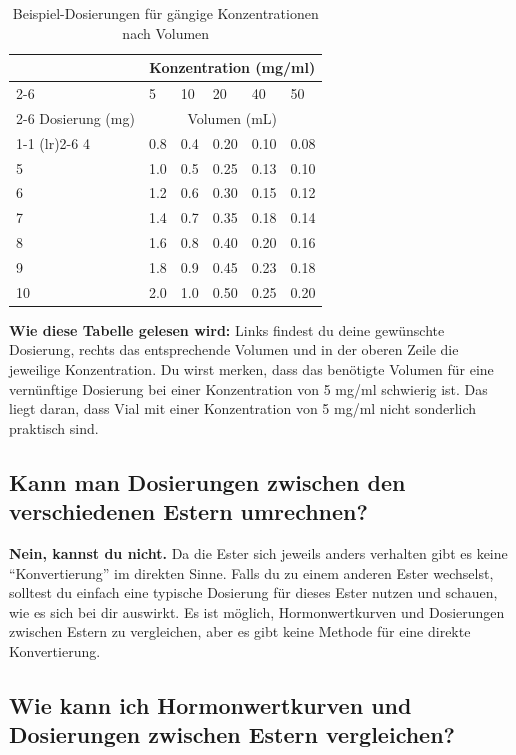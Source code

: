 \documentclass{article}
\begin{document}
\begin{table}
	\centering
	\caption{Beispiel-Dosierungen für gängige Konzentrationen nach Volumen}
	\label{tab:concentrations}
	\begin{tabular}{@{}llllll@{}}
		\toprule
		\multicolumn{1}{c}{} & \multicolumn{5}{c}{Konzentration (mg/ml)} \\
		\cmidrule(rl){2-6}
		& 5    & 10  & 20 & 40 & 50   \\
		\cmidrule(rl){2-6}
		Dosierung (mg) & \multicolumn{5}{c}{Volumen (mL)}  \\
		\cmidrule(r){1-1} \cmidrule(lr){2-6}
		4        & 0.8  & 0.4 & 0.20  & 0.10 & 0.08\\
		5        & 1.0    & 0.5 & 0.25 & 0.13 &  0.10\\
		6        & 1.2  & 0.6   & 0.30  & 0.15 & 0.12   \\
		7        & 1.4  & 0.7 & 0.35  & 0.18 & 0.14\\
		8        & 1.6  & 0.8   & 0.40  & 0.20 & 0.16  \\
		9        & 1.8  & 0.9 & 0.45  & 0.23 & 0.18\\
		10       & 2.0    & 1.0   & 0.50  & 0.25 & 0.20 \\
		\bottomrule
	\end{tabular}
\end{table}

\textbf{Wie diese Tabelle gelesen wird:} Links findest du deine gewünschte Dosierung, rechts das entsprechende Volumen und in der oberen Zeile die jeweilige Konzentration. Du wirst merken, dass das benötigte Volumen für eine vernünftige Dosierung bei einer Konzentration von 5 mg/ml schwierig ist. Das liegt daran, dass Vial mit einer Konzentration von 5 mg/ml nicht sonderlich praktisch sind.

\subsection{Kann man Dosierungen zwischen den verschiedenen Estern umrechnen?}

\textbf{Nein, kannst du nicht.} Da die Ester sich jeweils anders verhalten gibt es keine “Konvertierung” im direkten Sinne. Falls du zu einem anderen Ester wechselst, solltest du einfach eine typische Dosierung für dieses Ester nutzen und schauen, wie es sich bei dir auswirkt. Es ist möglich, Hormonwertkurven und Dosierungen zwischen Estern zu vergleichen, aber es gibt keine Methode für eine direkte Konvertierung.

\subsection{Wie kann ich Hormonwertkurven und Dosierungen zwischen Estern vergleichen?}
\end{document}
